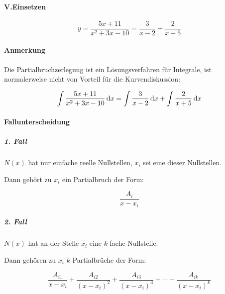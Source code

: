 \paragraph{V.\;Einsetzen}

\[
	y = \frac{5x + 11}{x^2 + 3x - 10} = \frac{3}{x-2} + \frac{2}{x+5}
\]

\paragraph{Anmerkung}

Die Partialbruchzerlegung ist ein Lösungsverfahren für Integrale, ist normalerweise nicht von Vorteil für
die Kurvendiskussion:

\[
	\int \frac{5x + 11}{x^2 + 3x - 10} \mathop{}\!\mathrm{d} x = \int \frac{3}{x-2} \mathop{}\!\mathrm{d} x + \int \frac{2}{x+5} \mathop{}\!\mathrm{d} x
\]

\paragraph{Fallunterscheidung}

\subparagraph{1. Fall}

\(N(x)\) hat nur einfache reelle Nullstellen, \(x_i\) sei eine dieser
Nullstellen.

Dann gehört zu \(x_i\) ein Partialbruch der Form:

\[
	\frac{A_i}{x - x_i}
\]

\subparagraph{2. Fall}

\(N(x)\) hat an der Stelle \(x_i\) eine \(k\)-fache Nullstelle.

Dann gehören zu \(x_i\) \(k\) Partialbrüche der Form:

\[
	\frac{A_{i1}}{x - x_i}  + \frac{A_{i2}}{{(x - x_i)}^2} + \frac{A_{i3}}{{(x - x_i)}^3} + \cdots + \frac{A_{ik}}{{(x - x_i)}^k}
\]
